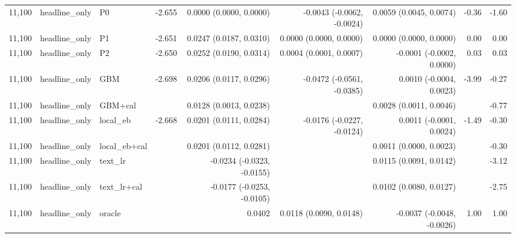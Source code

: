 \begin{tabular}{rllrrrrrr}
11,100 & headline\_only & P0 & -2.655 & 0.0000 (0.0000, 0.0000) & -0.0043 (-0.0062, -0.0024) & 0.0059 (0.0045, 0.0074) & -0.36 & -1.60 \\
11,100 & headline\_only & P1 & -2.651 & 0.0247 (0.0187, 0.0310) & 0.0000 (0.0000, 0.0000) & 0.0000 (0.0000, 0.0000) & 0.00 & 0.00 \\
11,100 & headline\_only & P2 & -2.650 & 0.0252 (0.0190, 0.0314) & 0.0004 (0.0001, 0.0007) & -0.0001 (-0.0002, 0.0000) & 0.03 & 0.03 \\
11,100 & headline\_only & GBM & -2.698 & 0.0206 (0.0117, 0.0296) & -0.0472 (-0.0561, -0.0385) & 0.0010 (-0.0004, 0.0023) & -3.99 & -0.27 \\
11,100 & headline\_only & GBM+cal &  & 0.0128 (0.0013, 0.0238) &  & 0.0028 (0.0011, 0.0046) &  & -0.77 \\
11,100 & headline\_only & local\_eb & -2.668 & 0.0201 (0.0111, 0.0284) & -0.0176 (-0.0227, -0.0124) & 0.0011 (-0.0001, 0.0024) & -1.49 & -0.30 \\
11,100 & headline\_only & local\_eb+cal &  & 0.0201 (0.0112, 0.0281) &  & 0.0011 (0.0000, 0.0023) &  & -0.30 \\
11,100 & headline\_only & text\_lr &  & -0.0234 (-0.0323, -0.0155) &  & 0.0115 (0.0091, 0.0142) &  & -3.12 \\
11,100 & headline\_only & text\_lr+cal &  & -0.0177 (-0.0253, -0.0105) &  & 0.0102 (0.0080, 0.0127) &  & -2.75 \\
11,100 & headline\_only & oracle & & 0.0402 & 0.0118 (0.0090, 0.0148) & -0.0037 (-0.0048, -0.0026) & 1.00 & 1.00 \\
\bottomrule
\end{tabular}
